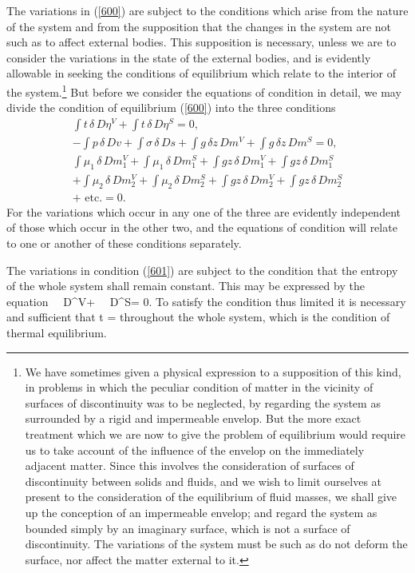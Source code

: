 \documentclass[12pt]{article}
\newcommand{\dd}{\delta}
\begin{document}
The variations in (\ref{600}) are subject to the conditions which arise from the nature of the system and from the supposition that the changes in the system are not such as to affect external bodies. This supposition is necessary, unless we are to consider the variations in the state of the external bodies, and is evidently allowable in seeking the conditions of equilibrium which relate to the interior of the system.\footnote{We have sometimes given a physical expression to a supposition of this kind, in problems in which the peculiar condition of matter in the vicinity of surfaces of discontinuity was to be neglected, by regarding the system as surrounded by a rigid and impermeable envelop. But the more exact treatment which we are now to give the problem of equilibrium would require us to take account of the influence of the envelop on the immediately adjacent matter. Since this involves the consideration of surfaces of discontinuity between solids and fluids, and we wish to limit ourselves at present to the consideration of the equilibrium of fluid masses, we shall give up the conception of an impermeable envelop; and regard the system as bounded simply by an imaginary surface, which is not a surface of discontinuity. The variations of the system must be such as do not deform the surface, nor affect the matter external to it.} But before we consider the equations of condition in detail, we may divide the condition of equilibrium (\ref{600}) into the three conditions
\begin{gather}\int t \, \dd \, D\eta^V+ \int t \, \dd \, D\eta^S = 0,   \label{601} \\
-\int p \, \dd \, Dv + \int \sigma \, \dd \, Ds + \int g \, \dd z \, Dm^V +\int g \, \dd z \, Dm^S = 0,  \label{602} \\
\int \mu_1 \,\dd\,Dm_1^V +  \int \mu_1 \,\dd\,Dm_1^S + \int gz \, \dd \, Dm_1^V+ \int gz \, \dd \, Dm_1^S \nonumber \\
+\int \mu_2 \,\dd\,Dm_2^V +  \int \mu_2 \,\dd\,Dm_2^S + \int gz \, \dd \, Dm_2^V+ \int gz \, \dd \, Dm_2^S  \nonumber \\
+ \text{ etc.} = 0.   \label{603} \end{gather}
For the variations which occur in any one of the three are evidently independent of those which occur in the other two, and the equations of condition will relate to one or another of these conditions separately.

The variations in condition (\ref{601}) are subject to the condition that the entropy of the whole system shall remain constant. This may be expressed by the equation
\eqs \int \, \dd \, D\eta^V+ \int \, \dd \, D\eta^S= 0.  \label{604} \eqe
To satisfy the condition thus limited it is necessary and sufficient that
\eqs t =   \label{605} \eqe
throughout the whole system, which is the condition of thermal equilibrium.
\end{document}
